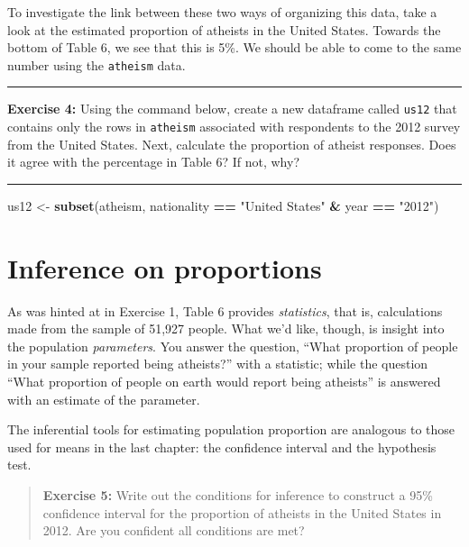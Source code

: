 \documentclass[]{book}
\newenvironment{Shaded}{\begin{snugshade}}{\end{snugshade}}
\newcommand{\KeywordTok}[1]{\textcolor[rgb]{0.13,0.29,0.53}{\textbf{#1}}}
\newcommand{\StringTok}[1]{\textcolor[rgb]{0.31,0.60,0.02}{#1}}
\newcommand{\OperatorTok}[1]{\textcolor[rgb]{0.81,0.36,0.00}{\textbf{#1}}}
\newcommand{\NormalTok}[1]{#1}
\theoremstyle{definition}
\theoremstyle{definition}
\theoremstyle{definition}
\theoremstyle{remark}
\begin{document}
To investigate the link between these two ways of organizing this data,
take a look at the estimated proportion of atheists in the United
States. Towards the bottom of Table 6, we see that this is 5\%. We
should be able to come to the same number using the \texttt{atheism}
data.

\begin{center}\rule{0.5\linewidth}{\linethickness}\end{center}

\textbf{Exercise 4:} Using the command below, create a new dataframe
called \texttt{us12} that contains only the rows in \texttt{atheism}
associated with respondents to the 2012 survey from the United States.
Next, calculate the proportion of atheist responses. Does it agree with
the percentage in Table 6? If not, why?

\begin{center}\rule{0.5\linewidth}{\linethickness}\end{center}

\begin{Shaded}
\begin{Highlighting}[]
\NormalTok{us12 <-}\StringTok{ }\KeywordTok{subset}\NormalTok{(atheism, nationality }\OperatorTok{==}\StringTok{ "United States"} \OperatorTok{&}\StringTok{ }\NormalTok{year }\OperatorTok{==}\StringTok{ "2012"}\NormalTok{)}
\end{Highlighting}
\end{Shaded}

\section{Inference on proportions}\label{inference-on-proportions}

As was hinted at in Exercise 1, Table 6 provides \emph{statistics}, that
is, calculations made from the sample of 51,927 people. What we'd like,
though, is insight into the population \emph{parameters}. You answer the
question, ``What proportion of people in your sample reported being
atheists?'' with a statistic; while the question ``What proportion of
people on earth would report being atheists'' is answered with an
estimate of the parameter.

The inferential tools for estimating population proportion are analogous
to those used for means in the last chapter: the confidence interval and
the hypothesis test.

\begin{quote}
\textbf{Exercise 5:} Write out the conditions for inference to construct
a 95\% confidence interval for the proportion of atheists in the United
States in 2012. Are you confident all conditions are met?
\end{quote}
\end{document}
